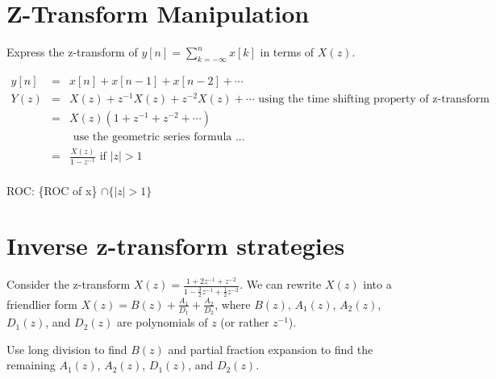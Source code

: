 \documentclass[11pt]{article}
\begin{document}
\section{Z-Transform Manipulation}
Express the z-transform of $y[n]=\sum\limits_{k=-\infty}^nx[k]$ in terms of $X(z)$.

{\color{blue}
\begin{eqnarray*}
y[n] &=&x[n]+x[n-1]+x[n-2]+\cdots \\
Y(z) &=& X(z)+z^{-1}X(z)+z^{-2}X(z)+ \cdots  \text{ using the time shifting property of z-transform}\\
&=& X(z)\left(1+z^{-1}+z^{-2}+ \cdots\right) \\
&& \text{ use the geometric series formula ...} \\
&=& \frac{X(z)}{1-z^{-1}} \text{ if } |z| > 1 \\
\end{eqnarray*}

ROC: \{ROC of x\} $\cap \{|z| > 1\}$
}

\section{Inverse z-transform strategies}

Consider the z-transform $X(z) = \frac{1+2z^{-1}+z^{-2}}{1-\frac{3}{2}z^{-1}+\frac{1}{2}z^{-2}}$. We can rewrite $X(z)$ into a friendlier form $X(z) = B(z) + \frac{A_1}{D_1} +\frac{A_2}{D_2}$, where $B(z)$, $A_1(z)$, $A_2(z)$, $D_1(z)$, and $D_2(z)$ are polynomials of $z$ (or rather $z^{-1}$). 

Use long division to find $B(z)$ and partial fraction expansion to find the remaining $A_1(z)$, $A_2(z)$, $D_1(z)$, and $D_2(z)$.
\end{document}
